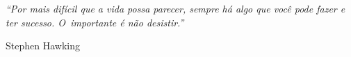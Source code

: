 \documentclass[
    12pt,
    a4paper,
    oneside,
    chapter=TITLE,
    section=TITLE,
    subsection=TITLE,
    subsubsection=TITLE,
    sumario=tradicional,
    english,
    brazil
]{abntex2}
\begin{document}
\begin{epigrafe}
    \vspace*{\fill}
    \begin{flushright}
        \begin{minipage}{0.5\textwidth}
            \raggedright
            \textit{``Por mais difícil que a vida possa parecer, sempre há algo que você pode fazer e ter sucesso. O~importante é não desistir.''}
            \par\medskip
            \raggedleft
            Stephen Hawking
        \end{minipage}
    \end{flushright}
\end{epigrafe}

\setlength{\absparsep}{18pt}
\end{document}
